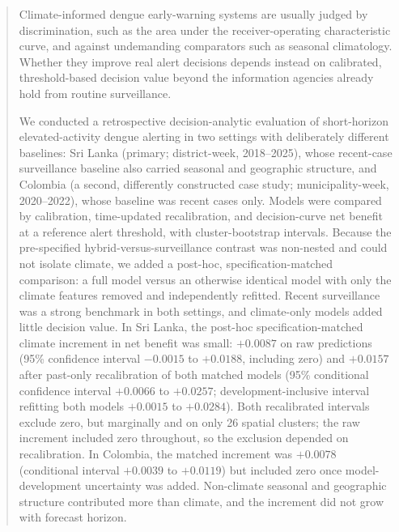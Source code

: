 \documentclass[11pt,a4paper]{article}
\begin{document}
\begin{abstract}
\noindent Climate-informed dengue early-warning systems are usually judged by discrimination, such as the area under the receiver-operating characteristic curve, and against undemanding comparators such as seasonal climatology. Whether they improve real alert decisions depends instead on calibrated, threshold-based decision value beyond the information agencies already hold from routine surveillance.

\noindent We conducted a retrospective decision-analytic evaluation of short-horizon elevated-activity dengue alerting in two settings with deliberately different baselines: Sri Lanka (primary; district-week, 2018--2025), whose recent-case surveillance baseline also carried seasonal and geographic structure, and Colombia (a second, differently constructed case study; municipality-week, 2020--2022), whose baseline was recent cases only. Models were compared by calibration, time-updated recalibration, and decision-curve net benefit at a reference alert threshold, with cluster-bootstrap intervals. Because the pre-specified hybrid-versus-surveillance contrast was non-nested and could not isolate climate, we added a post-hoc, specification-matched comparison: a full model versus an otherwise identical model with only the climate features removed and independently refitted. Recent surveillance was a strong benchmark in both settings, and climate-only models added little decision value. In Sri Lanka, the post-hoc specification-matched climate increment in net benefit was small: $+0.0087$ on raw predictions (95\% confidence interval $-0.0015$ to $+0.0188$, including zero) and $+0.0157$ after past-only recalibration of both matched models (95\% conditional confidence interval $+0.0066$ to $+0.0257$; development-inclusive interval refitting both models $+0.0015$ to $+0.0284$). Both recalibrated intervals exclude zero, but marginally and on only 26 spatial clusters; the raw increment included zero throughout, so the exclusion depended on recalibration. In Colombia, the matched increment was $+0.0078$ (conditional interval $+0.0039$ to $+0.0119$) but included zero once model-development uncertainty was added. Non-climate seasonal and geographic structure contributed more than climate, and the increment did not grow with forecast horizon.


\end{abstract}
\end{document}
